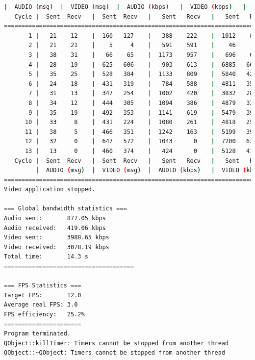 \begin{lstlisting}[language=bash,basicstyle=\ttfamily\tiny]
         |  AUDIO (msg)  |  VIDEO (msg)  |  AUDIO (kbps)   |  VIDEO (kbps)   |     CPU (%) 
   Cycle |  Sent  Recv   |  Sent  Recv   |   Sent   Recv   |   Sent   Recv   | Program System
================================================================================================
       1 |   21    12    |  160   127    |   388    222    |  1012    802    |  42      0       
       2 |   21    21    |    5     4    |   591    591    |    46     38    |  10     84       
       3 |   38    31    |   66    65    |  1173    957    |   696    686    |  30     78       
       4 |   28    19    |  625   606    |   903    613    |  6885   6676    |  22     76       
       5 |   35    25    |  528   384    |  1133    809    |  5840   4247    |  37     70       
       6 |   24    18    |  431   319    |   784    588    |  4811   3561    |  36     71       
       7 |   31    13    |  347   254    |  1002    420    |  3832   2804    |  36     73       
       8 |   34    12    |  444   305    |  1094    386    |  4879   3350    |  50     75       
       9 |   35    19    |  492   353    |  1141    619    |  5479   3929    |  28     74       
      10 |   33     8    |  431   224    |  1080    261    |  4818   2503    |  25     71       
      11 |   38     5    |  466   351    |  1242    163    |  5199   3917    |  43     74       
      12 |   32     0    |  647   572    |  1043      0    |  7200   6364    |  29     73       
      13 |   13     0    |  460   374    |   424      0    |  5128   4168    |  10     65       
   Cycle |  Sent  Recv   |  Sent  Recv   |   Sent   Recv   |   Sent   Recv   | Program System
         |  AUDIO (msg)  |  VIDEO (msg)  |  AUDIO (kbps)   |  VIDEO (kbps)   |     CPU (%) 
===========================================================================================
Video application stopped.

=== Global bandwidth statistics ===
Audio sent:       877.05 kbps
Audio received:   419.06 kbps
Video sent:       3988.65 kbps
Video received:   3078.19 kbps
Total time:       14.3 s
=====================================

=== FPS Statistics ===
Target FPS:       12.0
Average real FPS: 3.0
FPS efficiency:   25.2%
======================
Program terminated.
QObject::killTimer: Timers cannot be stopped from another thread
QObject::~QObject: Timers cannot be stopped from another thread
\end{lstlisting}
\vspace{\baselineskip}


